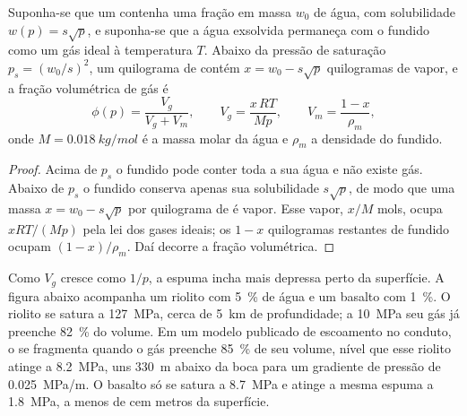 \begin{proposition}\label{prop:b2:eruptive-styles:gas}
Suponha-se que um  contenha uma fração em massa $w_0$ de água, com solubilidade $w(p) =
s\sqrt p$, e suponha-se que a água exsolvida permaneça com o fundido como um gás
ideal à temperatura $T$. Abaixo da pressão de saturação $p_s = (w_0/s)^2$, um
quilograma de  contém $x = w_0 - s\sqrt p$ quilogramas de vapor, e a fração
volumétrica de gás é
\[
\phi(p) = \frac{V_g}{V_g + V_m}, \qquad V_g = \frac{x\,RT}{M p}, \qquad
V_m = \frac{1 - x}{\rho_m},
\]
onde $M = \qty{0.018}{kg/mol}$ é a massa molar da água e $\rho_m$ a densidade
do fundido.
\end{proposition}

\begin{proof}
Acima de $p_s$ o fundido pode conter toda a sua água e não existe gás. Abaixo de $p_s$ o
fundido conserva apenas sua solubilidade $s\sqrt p$, de modo que uma massa $x = w_0 - s\sqrt p$ por
quilograma de  é vapor. Esse vapor, $x/M$ mols, ocupa $xRT/(Mp)$ pela
lei dos gases ideais; os $1 - x$ quilogramas restantes de fundido ocupam $(1 - x)/\rho_m$.
Daí decorre a fração volumétrica.
\end{proof}

Como $V_g$ cresce como $1/p$, a espuma incha mais depressa perto da superfície. A
figura abaixo acompanha um riolito com \qty{5}{\percent} de água e um basalto
com \qty{1}{\percent}. O riolito se satura a \qty{127}{MPa}, cerca de
\qty{5}{km} de profundidade; a \qty{10}{MPa} seu gás já preenche \qty{82}{\percent} do
volume. Em um modelo publicado de escoamento no conduto, o  se fragmenta quando o
gás preenche \qty{85}{\percent} de seu volume, nível que esse riolito atinge a
\qty{8.2}{MPa}, uns \qty{330}{m} abaixo da boca para um gradiente de pressão de
\qty{0.025}{MPa/m}. O basalto só se satura a \qty{8.7}{MPa} e atinge a
mesma espuma a \qty{1.8}{MPa}, a menos de cem metros da superfície.

